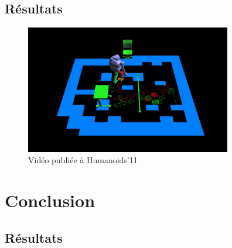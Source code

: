 \documentclass{beamer}
\begin{document}

\subsection{Résultats}
\begin{frame}
  \begin{figure}
	\includegraphics[width=9cm]{./images/img2}\\    
    Vidéo publiée à Humanoids'11
   \end{figure}
 \end{frame}

\section{Conclusion}
\subsection{Résultats}
\end{document}
